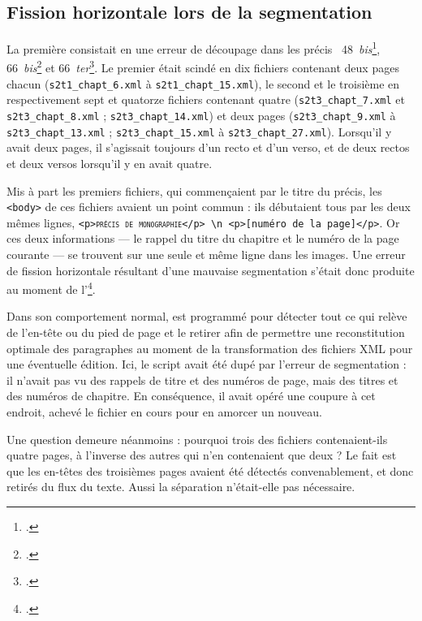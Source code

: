 \subsection{Fission horizontale lors de la segmentation}

La première consistait en une erreur de découpage dans les précis \no{}~48~\textit{bis}\footcite{mono048b}, 66~\textit{bis}\footcite{mono066b} et 66~\textit{ter}\footcite{mono066c}. Le premier était scindé en dix fichiers contenant deux pages chacun (\texttt{s2t1\_chapt\_6.xml} à \texttt{s2t1\_chapt\_15.xml}), le second et le troisième en respectivement sept et quatorze fichiers contenant quatre (\texttt{s2t3\_chapt\_7.xml} et \texttt{s2t3\_chapt\_8.xml} ; \texttt{s2t3\_chapt\_14.xml}) et deux pages (\texttt{s2t3\_chapt\_9.xml} à \texttt{s2t3\_chapt\_13.xml} ; \texttt{s2t3\_\-chapt\_15.xml} à \texttt{s2t3\_chapt\_27.xml}). Lorsqu'il y avait deux pages, il s'agissait toujours d'un recto et d'un verso, et de deux rectos et deux versos lorsqu'il y en avait quatre.

Mis à part les premiers fichiers, qui commençaient par le titre du précis, les \texttt{<body>} de ces fichiers avaient un point commun : ils débutaient tous par les deux mêmes lignes, \texttt{<p>\textsc{précis de monographie}</p> \textbackslash n <p>[numéro de la page]</p>}. Or ces deux informations --- le rappel du titre du chapitre et le numéro de la page courante --- se trouvent sur une seule et même ligne dans les images. Une erreur de fission horizontale résultant d'une mauvaise segmentation s'était donc produite au moment de l'\ocr\footcite[p. 5-6]{karpinski}.

Dans son comportement normal, \lse{} est programmé pour détecter tout ce qui relève de l'en-tête ou du pied de page et le retirer afin de permettre une reconstitution optimale des paragraphes au moment de la transformation des fichiers XML pour une éventuelle édition. Ici, le script avait été dupé par l'erreur de segmentation : il n'avait pas vu des rappels de titre et des numéros de page, mais des titres et des numéros de chapitre. En conséquence, il avait opéré une coupure à cet endroit, \cad{} achevé le fichier en cours pour en amorcer un nouveau.

Une question demeure néanmoins : pourquoi trois des fichiers contenaient-ils quatre pages, à l'inverse des autres qui n'en contenaient que deux ? Le fait est que les en-têtes des troisièmes pages avaient été détectés convenablement, et donc retirés du flux du texte. Aussi la séparation n'était-elle pas nécessaire.

